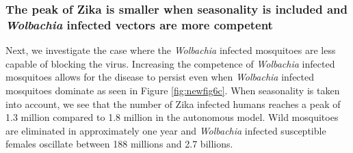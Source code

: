 \documentclass{ws-rv9x6}
\begin{document}
\subsubsection{The peak of Zika is smaller when seasonality is included and \textit{Wolbachia} infected vectors are more competent}
Next, we investigate the case where the \textit{Wolbachia} infected mosquitoes are less capable of blocking the virus.  Increasing the competence of \textit{Wolbachia} infected mosquitoes allows for the disease to persist even when \textit{Wolbachia} infected mosquitoes dominate as seen in Figure \ref{fig:newfig6c}. When seasonality is taken into account, we see that the number of Zika infected humans reaches a peak of 1.3 million compared to 1.8 million in the autonomous model. Wild mosquitoes are eliminated in approximately one year and \textit{Wolbachia} infected susceptible females oscillate between 188 millions and 2.7 billions. 




\end{document}
